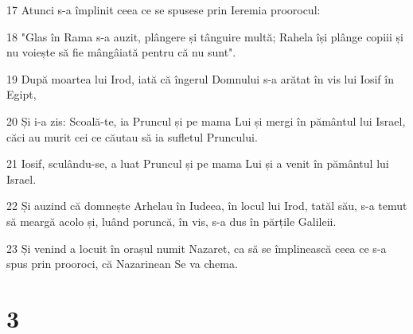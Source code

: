 \par 17 Atunci s-a împlinit ceea ce se spusese prin Ieremia proorocul:
\par 18 "Glas în Rama s-a auzit, plângere și tânguire multă; Rahela își plânge copiii și nu voiește să fie mângâiată pentru că nu sunt".
\par 19 După moartea lui Irod, iată că îngerul Domnului s-a arătat în vis lui Iosif în Egipt,
\par 20 Și i-a zis: Scoală-te, ia Pruncul și pe mama Lui și mergi în pământul lui Israel, căci au murit cei ce căutau să ia sufletul Pruncului.
\par 21 Iosif, sculându-se, a luat Pruncul și pe mama Lui și a venit în pământul lui Israel.
\par 22 Și auzind că domnește Arhelau în Iudeea, în locul lui Irod, tatăl său, s-a temut să meargă acolo și, luând poruncă, în vis, s-a dus în părțile Galileii.
\par 23 Și venind a locuit în orașul numit Nazaret, ca să se împlinească ceea ce s-a spus prin prooroci, că Nazarinean Se va chema.

\chapter{3}

